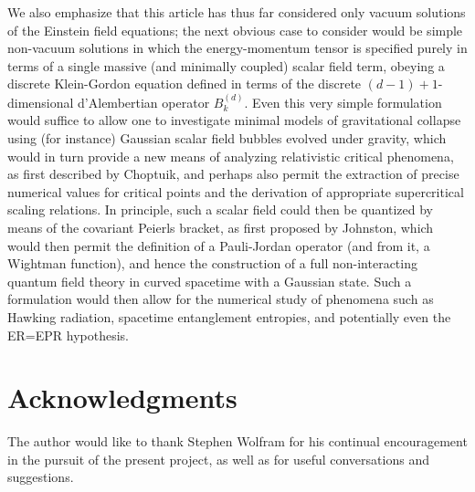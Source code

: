 \documentclass{article}
\begin{document}
We also emphasize that this article has thus far considered only vacuum solutions of the Einstein field equations; the next obvious case to consider would be simple non-vacuum solutions in which the energy-momentum tensor is specified purely in terms of a single massive (and minimally coupled) scalar field term, obeying a discrete Klein-Gordon equation defined in terms of the discrete ${\left( d - 1 \right) + 1}$-dimensional d'Alembertian operator ${B_{k}^{\left( d \right)}}$\cite{x}. Even this very simple formulation would suffice to allow one to investigate minimal models of gravitational collapse using (for instance) Gaussian scalar field bubbles evolved under gravity, which would in turn provide a new means of analyzing relativistic critical phenomena, as first described by Choptuik\cite{choptuik}\cite{gundlach2}, and perhaps also permit the extraction of precise numerical values for critical points and the derivation of appropriate supercritical scaling relations. In principle, such a scalar field could then be quantized by means of the covariant Peierls bracket, as first proposed by Johnston\cite{johnston}\cite{johnston2}\cite{johnston3}, which would then permit the definition of a Pauli-Jordan operator (and from it, a Wightman function), and hence the construction of a full non-interacting quantum field theory in curved spacetime with a Gaussian state. Such a formulation would then allow for the numerical study of phenomena such as Hawking radiation, spacetime entanglement entropies\cite{sorkin2}\cite{shah}, and potentially even the ER=EPR hypothesis.

\section*{Acknowledgments}

The author would like to thank Stephen Wolfram for his continual encouragement in the pursuit of the present project, as well as for useful conversations and suggestions.
\end{document}
